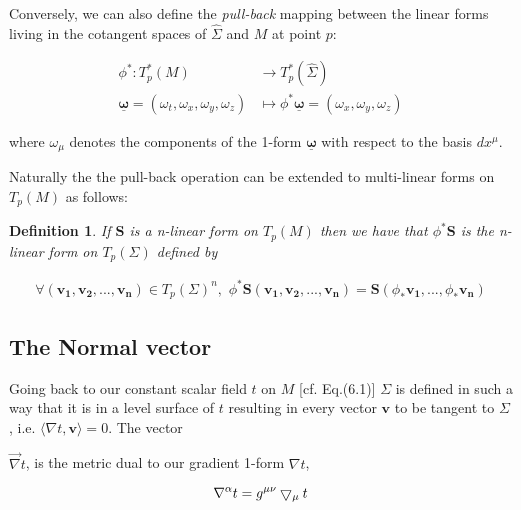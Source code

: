 \documentclass[12pt]{article}
\renewcommand{\vec}[1]{\bm{#1}}
\numberwithin{equation}{section}
\numberwithin{theorem}{subsection}
\newtheorem{definition}[theorem]{Definition}
\begin{document}
Conversely, we can also define the \textit{pull-back} mapping between the linear forms living in the cotangent spaces of $\hat{\Sigma}$ and $M$ at point $p$:

\begin{align*}

    \phi^{*} \colon T_{p}^{*}(M) &\to T_{p}^{*}(\hat{\Sigma}) \\

    \underline{\vec{\omega}} = (\omega_{t},\omega_{x},\omega_{y},\omega_{z}) &\mapsto \phi^{*}\underline{\vec{\omega}} = (\omega_{x}, \omega_{y}, \omega_{z})

\end{align*}

where $\omega_{\mu}$ denotes the components of the 1-form $\underline{\vec{\omega}}$ with respect to the basis $dx^{\mu}$.

\newline

Naturally the the pull-back operation can be extended to multi-linear forms on $T_{p}(M)$ as follows:

\begin{definition}

If $\vec{S}$ is a n-linear form on $T_{p}(M)$ then we have that $\phi^{*}\vec{S}$ is the n-linear form on $T_{p}(\Sigma)$ defined by

\begin{align*}

    \forall(\vec{v_{1}},\vec{v_{2}},...,\vec{v_{n}}) \in T_{p}(\Sigma)^{n}, \, \, \phi^{*}\vec{S}(\vec{v_{1}},\vec{v_{2}},...,\vec{v_{n}}) = \vec{S}(\phi_{*}\vec{v_{1}},...,\phi_{*}\vec{v_{n}})

\end{align*}

\end{definition}

\subsection{The Normal vector}

Going back to our constant scalar field $t$ on $M$ [cf. Eq.(6.1)] $\Sigma$ is defined in such a way that it is in a level surface of $t$ resulting in every vector $\vec{v}$ to be tangent to $\Sigma$, i.e. $\langle \nabla t,\vec{v}\rangle=0$. The vector

$\overrightarrow{\nabla} t$, is the metric dual to our gradient 1-form $\nabla t$,

$$\nabla^{\alpha} t = \tensor{g}{^\mu^\nu} \bigtriangledown_{\mu} t$$
\end{document}
